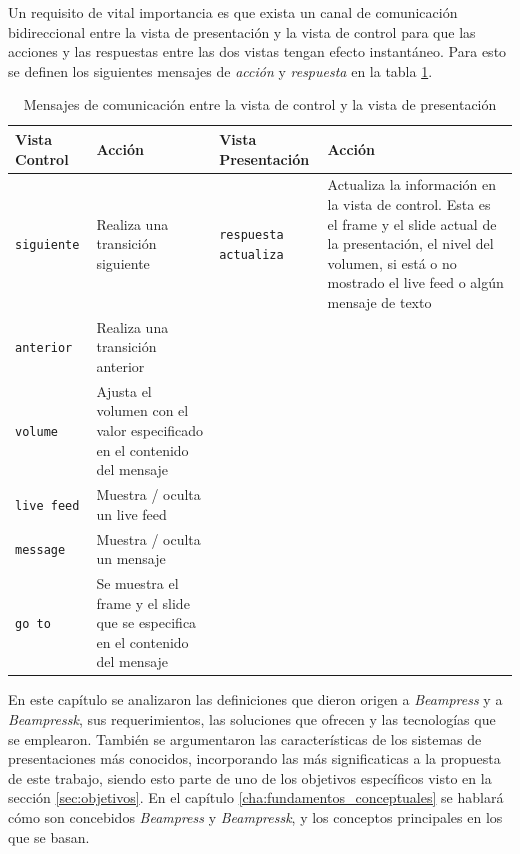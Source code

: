 		Un requisito de vital importancia es que exista un canal de comunicación bidireccional entre la vista de presentación y la vista de control para que las acciones y las respuestas entre las dos vistas tengan efecto instantáneo. Para esto se definen los siguientes mensajes de \textit{acción} y \textit{respuesta} en la tabla \ref{tab:messages}.

			\begin{table}[b]
				\caption{Mensajes de comunicación entre la vista de control y la vista de presentación}
				\label{tab:messages}
				\centering
			
				\begin{tabular}{| m{2cm} | m{3cm} | m{2.5cm} | m{3cm} |}
				\hline
			
				\hline
					\textbf{Vista Control} & \textbf{Acción} & \textbf{Vista \newline Presentación} & \textbf{Acción} \\
				\hline
					\texttt{siguiente} & Realiza una transición siguiente & \texttt{respuesta actualiza} & Actualiza la información en la vista de control. Esta es el frame y el slide actual de la presentación, el nivel del volumen, si está o no mostrado el live feed o algún mensaje de texto  \\ \cline{1-2}

					\texttt{anterior} & Realiza una transición anterior &   &  \\ \cline{1-2}

					\texttt{volume} & Ajusta el volumen con el valor especificado en el contenido del mensaje &  &  \\ \cline{1-2}

					\texttt{live feed} & Muestra / oculta un live feed &  &  \\ \cline{1-2}

					\texttt{message} & Muestra / oculta un mensaje &  &  \\ \cline{1-2}

					\texttt{go to} & Se muestra el frame y el slide que se especifica en el contenido del mensaje &  &  \\ 
				\hline																																
			
				\hline
				\end{tabular}
			\end{table}	


		En este capítulo se analizaron las definiciones que dieron origen a \textit{Beampress} y a \textit{Beampressk}, sus requerimientos, las soluciones que ofrecen y las tecnologías que se emplearon. También se argumentaron las características de los sistemas de presentaciones más conocidos, incorporando las más significaticas a la propuesta de este trabajo, siendo esto parte de uno de los objetivos específicos visto en la sección \ref{sec:objetivos}. En el capítulo \ref{cha:fundamentos_conceptuales} se hablará cómo son concebidos \textit{Beampress} y \textit{Beampressk}, y los conceptos principales en los que se basan.


	





